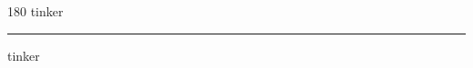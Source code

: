 
\begin{frame}
\begin{center}
\begin{turn}{180}
{\fontsize{2.5cm}{1em}\selectfont tinker}
\end{turn}
\vspace{1em}\par  
\hrule
\vspace{1em}\par  
{\fontsize{2.5cm}{1em}\selectfont tinker}
\end{center}
\end{frame}
